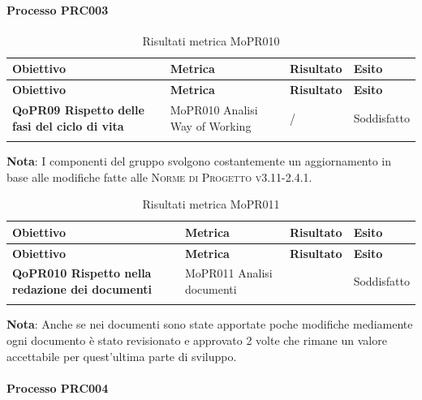 \paragraph{Processo PRC003}
\label{sub:processo_PRC003}

\renewcommand{\arraystretch}{2} %
\begin{longtable}[H]{>{\centering\bfseries}m{5cm} >{\centering}m{5cm} >{\centering}m{2.5cm} >{\centering\arraybackslash}m{2.5cm}}  
  \rowcolor{lightgray}
  {\textbf{Obiettivo}} & {\textbf{Metrica}} & {\textbf{Risultato}} & {\textbf{Esito}}  \\
  \endfirsthead%
  \rowcolor{lightgray}
  {\textbf{Obiettivo}} & {\textbf{Metrica}} & {\textbf{Risultato}} & {\textbf{Esito}}  \\
  \endhead%
  \textbf{QoPR09 Rispetto delle fasi del ciclo di vita} & MoPR010 Analisi Way of Working & / & Soddisfatto \\
  \caption{Risultati metrica MoPR010}
  \label{tab:my-table}
\end{longtable}
\textbf{Nota}: I componenti del gruppo svolgono costantemente un aggiornamento in base alle modifiche fatte alle \textsc{Norme di Progetto v3.11-2.4.1}.

\renewcommand{\arraystretch}{2} %
\begin{longtable}[H]{>{\centering\bfseries}m{5cm} >{\centering}m{5cm} >{\centering}m{2.5cm} >{\centering\arraybackslash}m{2.5cm}}  
  \rowcolor{lightgray}
  {\textbf{Obiettivo}} & {\textbf{Metrica}} & {\textbf{Risultato}} & {\textbf{Esito}}  \\
  \endfirsthead%
  \rowcolor{lightgray}
  {\textbf{Obiettivo}} & {\textbf{Metrica}} & {\textbf{Risultato}} & {\textbf{Esito}}  \\
  \endhead%
  \textbf{QoPR010 Rispetto nella redazione dei documenti} & MoPR011 Analisi documenti & 2 & Soddisfatto \\
  \caption{Risultati metrica MoPR011}
  \label{tab:my-table}
\end{longtable}
\textbf{Nota}: Anche se nei documenti sono state apportate poche modifiche mediamente ogni documento è stato revisionato e approvato 2 volte che rimane un valore accettabile per quest'ultima parte di sviluppo.

\paragraph{Processo PRC004}
\label{sub:processo_PRC004}

